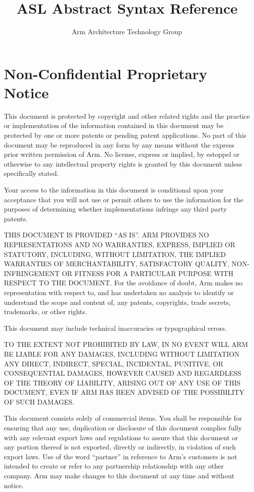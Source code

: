 \documentclass{book}
\author{Arm Architecture Technology Group}
\title{ASL Abstract Syntax Reference}
\begin{document}
\maketitle

\tableofcontents{}

\chapter{Non-Confidential Proprietary Notice}
 
This document is protected by copyright and other related rights and the
practice or implementation of the information contained in this document may be
protected by one or more patents or pending patent applications. No part of
this document may be reproduced in any form by any means without the express
prior written permission of Arm. No license, express or implied, by estoppel or
otherwise to any intellectual property rights is granted by this document
unless specifically stated.
               
Your access to the information in this document is conditional upon your
acceptance that you will not use or permit others to use the information for
the purposes of determining whether implementations infringe any third party
patents.
 
THIS DOCUMENT IS PROVIDED “AS IS”. ARM PROVIDES NO REPRESENTATIONS AND NO
WARRANTIES, EXPRESS, IMPLIED OR STATUTORY, INCLUDING, WITHOUT LIMITATION, THE
IMPLIED WARRANTIES OF MERCHANTABILITY, SATISFACTORY QUALITY, NON-INFRINGEMENT
OR FITNESS FOR A PARTICULAR PURPOSE WITH RESPECT TO THE DOCUMENT. For the
avoidance of doubt, Arm makes no representation with respect to, and has
undertaken no analysis to identify or understand the scope and content of, any
patents, copyrights, trade secrets, trademarks, or other rights. 
 
This document may include technical inaccuracies or typographical errors.
 
TO THE EXTENT NOT PROHIBITED BY LAW, IN NO EVENT WILL ARM BE LIABLE FOR ANY
DAMAGES, INCLUDING WITHOUT LIMITATION ANY DIRECT, INDIRECT, SPECIAL,
INCIDENTAL, PUNITIVE, OR CONSEQUENTIAL DAMAGES, HOWEVER CAUSED AND REGARDLESS
OF THE THEORY OF LIABILITY, ARISING OUT OF ANY USE OF THIS DOCUMENT, EVEN IF
ARM HAS BEEN ADVISED OF THE POSSIBILITY OF SUCH DAMAGES.
 
This document consists solely of commercial items. You shall be responsible for
ensuring that any use, duplication or disclosure of this document complies
fully with any relevant export laws and regulations to assure that this
document or any portion thereof is not exported, directly or indirectly, in
violation of such export laws. Use of the word “partner” in reference to Arm’s
customers is not intended to create or refer to any partnership relationship
with any other company. Arm may make changes to this document at any time and
without notice.
 
\end{document}
